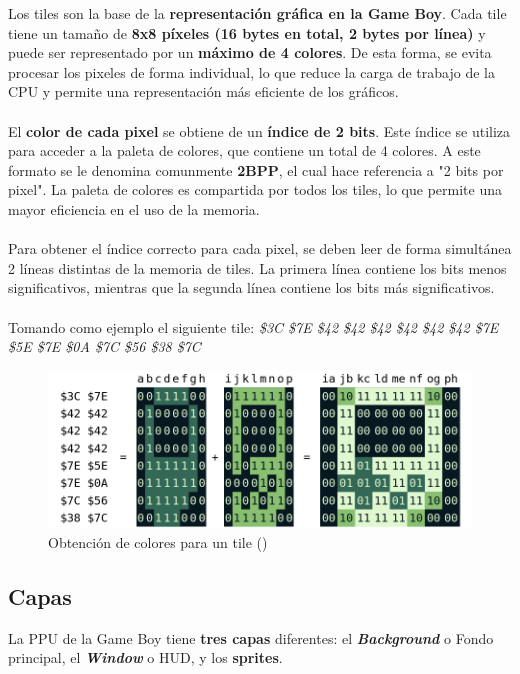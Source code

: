 Los tiles son la base de la \textbf{representación gráfica en la Game Boy}. Cada tile tiene un tamaño de \textbf{8x8 píxeles (16 bytes en total, 2 bytes por línea)} y puede ser representado por un \textbf{máximo de 4 colores}. De esta forma, se evita procesar los pixeles de forma individual, lo que reduce la carga de trabajo de la CPU y permite una representación más eficiente de los gráficos.
\\\\
El \textbf{color de cada pixel} se obtiene de un \textbf{índice de 2 bits}. Este índice se utiliza para acceder a la paleta de colores, que contiene un total de 4 colores. A este formato se le denomina comunmente \textbf{2BPP}, el cual hace referencia a "2 bits por pixel". La paleta de colores es compartida por todos los tiles, lo que permite una mayor eficiencia en el uso de la memoria.
\\\\ 
Para obtener el índice correcto para cada pixel, se deben leer de forma simultánea 2 líneas distintas de la memoria de tiles. La primera línea contiene los bits menos significativos, mientras que la segunda línea contiene los bits más significativos.
\\\\
Tomando como ejemplo el siguiente tile: \textit{\$3C \$7E \$42 \$42 \$42 \$42 \$42 \$42 \$7E \$5E \$7E \$0A \$7C \$56 \$38 \$7C}

\begin{figure}[H]
    \centering
    \includegraphics[width=1\textwidth]{include/images/colores_bits_tile.png}
    \caption{Obtención de colores para un tile (\cite{newpandocs})}
    \label{figure:tile_colors}
\end{figure}

\clearpage

\subsection{Capas}

La PPU de la Game Boy tiene \textbf{tres capas} diferentes: el \textbf{\textit{Background}} o Fondo principal, el \textbf{\textit{Window}} o HUD, y los \textbf{sprites}.

